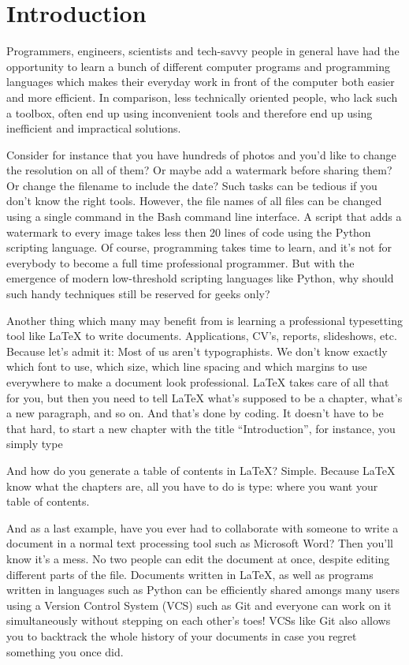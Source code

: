 \chapter{Introduction}
Programmers, engineers, scientists and tech-savvy people in general have had the opportunity to learn a bunch of different computer programs and programming languages which makes their everyday work in front of the computer both easier and more efficient. In comparison, less technically oriented people, who lack such a toolbox, often end up using inconvenient tools and therefore end up using inefficient and impractical solutions.

Consider for instance that you have hundreds of photos and you’d like to change the resolution on all of them? Or maybe add a watermark before sharing them? Or change the filename to include the date? Such tasks can be tedious if you don’t know the right tools. However, the file names of all files can be changed using a single command in the Bash command line interface. A script that adds a watermark to every image takes less then 20 lines of code using the Python scripting language. Of course, programming takes time to learn, and it’s not for everybody to become a full time professional programmer. But with the emergence of modern low-threshold scripting languages like Python, why should such handy techniques still be reserved for geeks only?

Another thing which many may benefit from is learning a professional typesetting tool like LaTeX to write documents. Applications, CV’s, reports, slideshows, etc. Because let’s admit it: Most of us aren’t typographists. We don’t know exactly which font to use, which size, which line spacing and which margins to use everywhere to make a document look professional. LaTeX takes care of all that for you, but then you need to tell LaTeX what’s supposed to be a chapter, what’s a new paragraph, and so on. And that’s done by coding. It doesn’t have to be that hard, to start a new chapter with the title “Introduction”, for instance, you simply type 

And how do you generate a table of contents in LaTeX? Simple. Because LaTeX know what the chapters are, all you have to do is type:
\latexone{\tableofcontents}
where you want your table of contents.

And as a last example, have you ever had to collaborate with someone to write a document in a normal text processing tool such as Microsoft Word? Then you’ll know it’s a mess. No two people can edit the document at once, despite editing different parts of the file. Documents written in LaTeX, as well as programs written in languages such as Python can be efficiently shared amongs many users using a Version Control System (VCS) such as Git and everyone can work on it simultaneously without stepping on each other’s toes! VCSs like Git also allows you to backtrack the whole history of your documents in case you regret something you once did.

